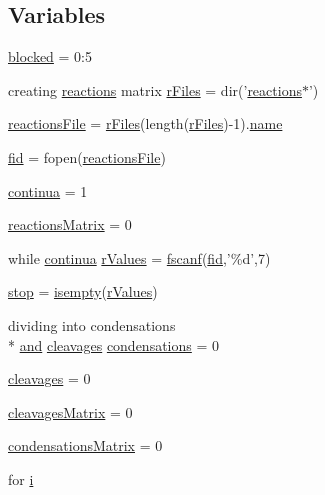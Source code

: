 \subsection*{Variables}
\begin{DoxyCompactItemize}
\item 
\hyperlink{a00030_a1faaaae288fc8ca4ed1751049aa2f84f}{blocked} = 0\-:5
\item 
creating \hyperlink{a00021}{reactions} matrix \hyperlink{a00030_ad75735665492cabd747370126464fddf}{r\-Files} = dir('\hyperlink{a00021}{reactions}$\ast$')
\item 
\hyperlink{a00030_a4c72dba1fe2ee2fbcc699262a8d0c624}{reactions\-File} = \hyperlink{a00030_ad75735665492cabd747370126464fddf}{r\-Files}(length(\hyperlink{a00030_ad75735665492cabd747370126464fddf}{r\-Files})-\/1).\hyperlink{a00027_abbf559a76fab59203496b0847ab9502a}{name}
\item 
\hyperlink{a00030_ae9011d40c6f13e68e6f07156e0da7c5d}{fid} = fopen(\hyperlink{a00030_a4c72dba1fe2ee2fbcc699262a8d0c624}{reactions\-File})
\item 
\hyperlink{a00030_a9c951ebd5bc3f1adce943bee1255f4d6}{continua} = 1
\item 
\hyperlink{a00030_ac52097a2745fcef31eb175d2e9485845}{reactions\-Matrix} = 0
\item 
while \hyperlink{a00030_a9c951ebd5bc3f1adce943bee1255f4d6}{continua} \hyperlink{a00030_a436a6968124e560649654a4abbd9dac6}{r\-Values} = \hyperlink{a00025_a028ac102a731e62fb0a7439381f566c1}{fscanf}(\hyperlink{a00031_ae9011d40c6f13e68e6f07156e0da7c5d}{fid},'\%d',7)
\item 
\hyperlink{a00030_a6bd08e37edf4151f5f6d1fc27a6f227a}{stop} = \hyperlink{a00025_ac10445404f4b83302522defb59e25ef7}{isempty}(\hyperlink{a00030_a436a6968124e560649654a4abbd9dac6}{r\-Values})
\item 
dividing into condensations \\*
\hyperlink{a00028_a170f8acb213f91bf71c77b1d20bceb33}{and} \hyperlink{a00030_a89060c6979e5a4ff7b0985b35f295695}{cleavages} \hyperlink{a00030_ad3aa27d88a7e9d77d8334155860269bb}{condensations} = 0
\item 
\hyperlink{a00030_a89060c6979e5a4ff7b0985b35f295695}{cleavages} = 0
\item 
\hyperlink{a00030_a1a691fb4f955887edfa538e91479fafe}{cleavages\-Matrix} = 0
\item 
\hyperlink{a00030_afaba8eef2f8f4e4dda2e893a19e55a94}{condensations\-Matrix} = 0
\item 
for \hyperlink{a00030_ae938073aeda31fad21f2546017d92d4d}{i}

\end{DoxyCompactItemize}
